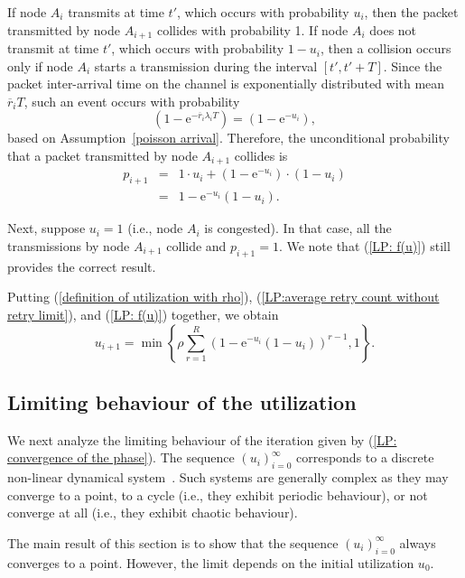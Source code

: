 \documentclass{IEEEtran}
\begin{document}
If node $A_i$ transmits at time $t'$, which occurs with probability $u_i$, then the packet transmitted by node $A_{i+1}$ collides with probability 1. If node $A_i$
does not transmit at time $t'$, which occurs with probability $1-u_i$, then a collision occurs only if  node $A_i$ starts a transmission during the interval
$[t',t'+T]$. Since the packet inter-arrival time on the channel is exponentially distributed with mean $\overline{r}_i T$, such an event
occurs with probability
\begin{equation}
(1 - \mathrm{e}^{-\overline{r}_i \lambda_i T}) = (1 - \mathrm{e}^{-u_i}),
\end{equation}
based on Assumption~\ref{poisson arrival}. Therefore, the unconditional probability that a packet transmitted by node
$A_{i+1}$ collides is
\begin{eqnarray} \label{LP: f(u)}
  p_{i+1} &  = & 1 \cdot u_i + (1 - \mathrm{e}^{-u_i})\cdot(1-u_i) \nonumber \\
  & = & 1 - \mathrm{e}^{-u_i}(1-u_i).
\end{eqnarray}


Next, suppose $u_i = 1$ (i.e., node $A_i$ is congested). In that case, all the transmissions by node $A_{i+1}$ collide and $p_{i+1}=1$. We note that
(\ref{LP: f(u)}) still provides the correct result.

Putting (\ref{definition of utilization with rho}), (\ref{LP:average retry count without retry limit}), and
(\ref{LP: f(u)}) together, we obtain
\begin{equation}  \label{LP: convergence of the phase}
u_{i+1}  =  \min \left\lbrace \rho \sum_{r=1}^{R} \left( 1 - \mathrm{e}^{-u_{i}}(1-u_{i}) \right) ^{r-1}, 1 \right\rbrace.
\end{equation}



\subsection{Limiting behaviour of the utilization}
We next analyze the limiting behaviour of the iteration given by (\ref{LP: convergence of the phase}). The sequence $(u_i)_{i=0}^{\infty}$
corresponds to a discrete non-linear dynamical system~\cite{lynch2004dynamical}. Such systems are generally complex as they may converge to a point,
to a cycle  (i.e., they exhibit periodic behaviour), or not converge at all (i.e., they exhibit chaotic behaviour).

The main result of this section is to show that the sequence $(u_i)_{i=0}^{\infty}$ always converges to a point. However, the limit depends on the
initial utilization $u_0$.
\end{document}

